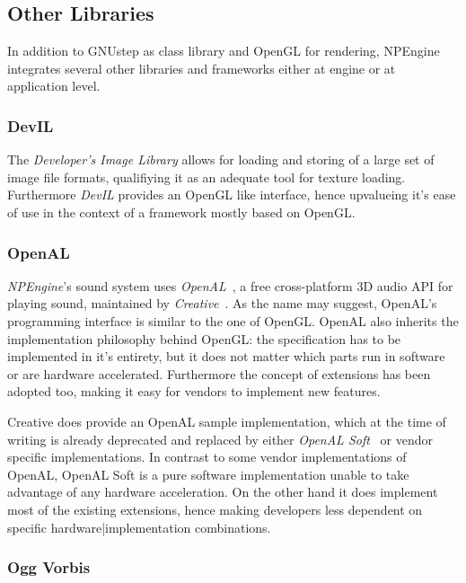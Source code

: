 \subsection{Other Libraries}

In addition to GNUstep as class library and OpenGL for rendering, NPEngine
integrates several other libraries and frameworks either at engine or at
application level.

\subsubsection{DevIL}

The \textit{Developer's Image Library}\cite{misc:devil} allows for loading and
storing of a large set of image file formats, qualifiying it as an adequate
tool for texture loading. Furthermore \textit{DevIL} provides an OpenGL like
interface, hence upvalueing it's ease of use in the context of a framework
mostly based on OpenGL.

\subsubsection{OpenAL}

\textit{NPEngine}'s sound system uses \textit{OpenAL}~\cite{misc:openal}, a free
cross-platform 3D audio API for playing sound, maintained by
\textit{Creative}~\cite{misc:creative}. As the name may suggest, OpenAL's
programming interface is similar to the one of OpenGL. OpenAL also inherits
the implementation philosophy behind OpenGL: the specification has to be
implemented in it's entirety, but it does not matter which parts run in software
or are hardware accelerated. Furthermore the concept of extensions has been
adopted too, making it easy for vendors to implement new features.

Creative does provide an OpenAL sample implementation, which at the time of
writing is already deprecated and replaced by either \textit{OpenAL
Soft}~\cite{misc:openal-soft} or vendor specific implementations. In contrast to
some vendor implementations of OpenAL, OpenAL Soft is a pure software
implementation unable to take advantage of any hardware acceleration. On the
other hand it does implement most of the existing extensions, hence making
developers less dependent on specific hardware|implementation combinations.

\subsubsection{Ogg Vorbis}


